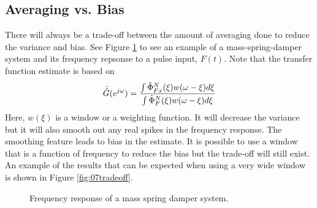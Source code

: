 \subsection{Averaging vs. Bias}
There will always be a trade-off between the amount of averaging done to reduce the variance and bias. See Figure \ref{fig:07msd} to see an example of a mass-spring-damper system and its frequency repsonse to a pulse input, $F(t)$. Note that the transfer function estimate is based on
$$\hat{\hat{G}}(e^{j\omega}) = \frac{\int\hat{\Phi}_{Fx}^N(\xi)w(\omega-\xi)d\xi}{\int \hat{\Phi}_F^N(\xi)w(\omega-\xi)d\xi}$$
Here, $w(\xi)$ is a window or a weighting function. It will decrease the variance but it will also smooth out any real spikes in the frequency response. The smoothing feature leads to bias in the estimate. It is possible to use a window that is a function of frequency to reduce the bias but the trade-off will still exist. An example of the results that can be expected when using a very wide window is shown in Figure \ref{fig:07tradeoff}.

\begin{figure}[ht!]
  \centering
   \hfill
   \hfill
  \caption{Frequency response of a mass spring damper system.}
  \label{fig:07msd}
\end{figure}

